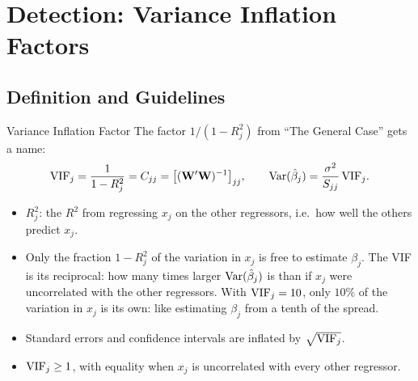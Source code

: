 \section{Detection: Variance Inflation Factors}


\subsection{Definition and Guidelines}


\begin{frame}{Variance Inflation Factor}
    \small
    The factor $1/(1-R_j^2)$ from ``The General Case'' gets a name:
    \[
    \mathrm{VIF}_j=\frac{1}{1-R_j^2}=C_{jj}=\bigl[(\mathbf{W}'\mathbf{W})^{-1}\bigr]_{jj},
    \qquad
    \operatorname{Var}(\hat\beta_j)=\frac{\sigma^2}{S_{jj}}\,\mathrm{VIF}_j .
    \]
    \begin{itemize}
        \item $R_j^2$: the $R^2$ from regressing $x_j$ on the other regressors, i.e.\ how well the others predict $x_j$.
        \item Only the fraction $1-R_j^2$ of the variation in $x_j$ is free to estimate $\beta_j$. The VIF is its reciprocal: how many times larger $\operatorname{Var}(\hat\beta_j)$ is than if $x_j$ were uncorrelated with the other regressors. With $\mathrm{VIF}_j=10$, only $10\%$ of the variation in $x_j$ is its own: like estimating $\beta_j$ from a tenth of the spread.
        \item Standard errors and confidence intervals are inflated by $\sqrt{\mathrm{VIF}_j}$.
        \item $\mathrm{VIF}_j\ge1$, with equality when $x_j$ is uncorrelated with every other regressor.
    \end{itemize}
\end{frame}





